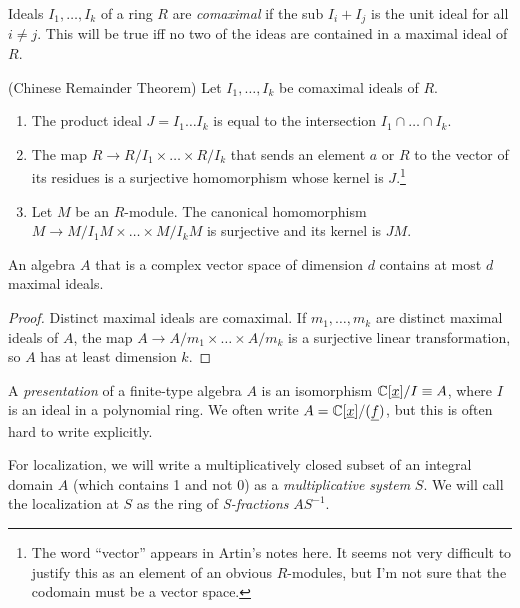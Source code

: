 \documentclass{report}
\begin{document}
Ideals $I_1,\dots,I_k$ of a ring $R$ are \emph{comaximal} if the sub $I_i + I_j$ is the unit ideal for all $i \neq j$.
This will be true iff no two of the ideas are contained in a maximal ideal of $R$.
\begin{theorem}
  {\normalfont (Chinese Remainder Theorem)} Let $I_1,\dots,I_k$ be comaximal ideals of $R$.
  \begin{enumerate}[label=(\textbf{\roman*})]
    \item The product ideal $J = I_1\dots I_k$ is equal to the intersection $I_1 \cap \dots \cap I_k$.
    \item The map $R \rightarrow R/I_1 \times \dots \times R/I_k$ that sends an element $a$ or $R$ to the vector of its residues is a surjective homomorphism whose kernel is $J$.\footnote{The word ``vector'' appears in Artin's notes here. It seems not very difficult to justify this as an element of an obvious $R$-modules, but I'm not sure that the codomain must be a vector space.}
    \item Let $M$ be an $R$-module. The canonical homomorphism $M \rightarrow M/I_1M \times \dots \times M/I_kM$ is surjective and its kernel is $JM$.
  \end{enumerate}
\end{theorem}
\begin{corollary}
  An algebra $A$ that is a complex vector space of dimension $d$ contains at most $d$ maximal ideals.
\end{corollary}
\begin{proof}
  Distinct maximal ideals are comaximal.
  If $m_1,\dots,m_k$ are distinct maximal ideals of $A$, the map $A \rightarrow A/m_1 \times \dots \times A/m_k$ is a surjective linear transformation, so $A$ has at least dimension $k$.
\end{proof}

A \emph{presentation} of a finite-type algebra $A$ is an isomorphism $\mathbb{C}[\underline x]/I \equiv A$, where $I$ is an ideal in a polynomial ring.
We often write $A = \mathbb{C}[\underline x]/(\underline f)$, but this is often hard to write explicitly.

For localization, we will write a multiplicatively closed subset of an integral domain $A$ (which contains 1 and not 0) as a \emph{multiplicative system} $S$.
We will call the localization at $S$ as the ring of \emph{S-fractions} $AS^{-1}$.
\end{document}
